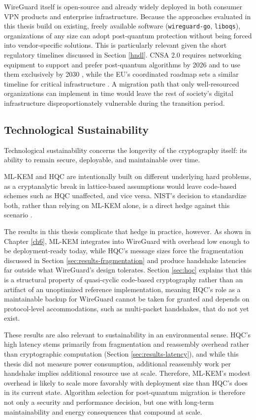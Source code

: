 WireGuard itself is open-source and already widely deployed in both consumer VPN products and enterprise infrastructure. Because the approaches evaluated in this thesis build on existing, freely available software (\texttt{wireguard-go}, \texttt{liboqs}), organizations of any size can adopt post-quantum protection without being forced into vendor-specific solutions. This is particularly relevant given the short regulatory timelines discussed in Section \ref{hndl}. CNSA 2.0 requires networking equipment to support and prefer post-quantum algorithms by 2026 and to use them exclusively by 2030 \cite{NSA2022CNSA2}, while the EU's coordinated roadmap sets a similar timeline for critical infrastructure \cite{EUPQC2025Roadmap}. A migration path that only well-resourced organizations can implement in time would leave the rest of society's digital infrastructure disproportionately vulnerable during the transition period.

\subsection{Technological Sustainability}
Technological sustainability concerns the longevity of the cryptography itself: its ability to remain secure, deployable, and maintainable over time. 

ML-KEM and HQC are intentionally built on different underlying hard problems, as a cryptanalytic break in lattice-based assumptions would leave code-based schemes such as HQC unaffected, and vice versa. NIST's decision to standardize both, rather than relying on ML-KEM alone, is a direct hedge against this scenario \cite{Moody2025NISTIR8545}.

The results in this thesis complicate that hedge in practice, however. As shown in Chapter \ref{ch6}, ML-KEM integrates into WireGuard with overhead low enough to be deployment-ready today, while HQC's message sizes force the fragmentation discussed in Section \ref{sec:results-fragmentation} and produce handshake latencies far outside what WireGuard's design tolerates. Section \ref{sec:hqc} explains that this is a structural property of quasi-cyclic code-based cryptography rather than an artifact of an unoptimized reference implementation, meaning HQC's role as a maintainable backup for WireGuard cannot be taken for granted and depends on protocol-level accommodations, such as multi-packet handshakes, that do not yet exist.

These results are also relevant to sustainability in an environmental sense. HQC's high latency stems primarily from fragmentation and reassembly overhead rather than cryptographic computation (Section \ref{sec:results-latency}), and while this thesis did not measure power consumption, additional reassembly work per handshake implies additional resource use at scale. Therefore, ML-KEM's modest overhead is likely to scale more favorably with deployment size than HQC's does in its current state. Algorithm selection for post-quantum migration is therefore not only a security and performance decision, but one with long-term maintainability and energy consequences that compound at scale.


